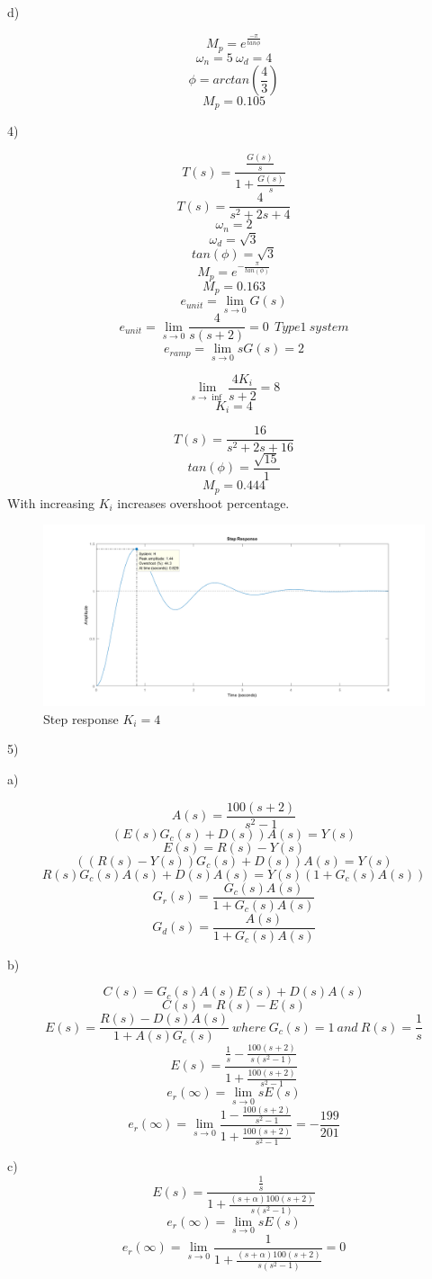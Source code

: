 \documentclass[11pt]{article}
\begin{document}
d)

$$M_p=e^{\frac{-\pi}{tan\phi}}$$
\[\omega_n=5 \> \omega_d=4\]
\[\phi=arctan(\frac{4}{3})\]
$$M_p=0.105$$

4)

\[T(s)=\frac{\frac{G(s)}{s}}{1+\frac{G(s)}{s}}\]
\[T(s)=\frac{4}{s^2+2s+4}\]
\[\omega_n=2\]
\[\omega_d=\sqrt{3}\]
\[tan(\phi)=\sqrt{3}\]
\[M_p=e^{-\frac{\pi}{tan(\phi)}}\]
\[M_p=0.163\]
\[e_{unit}=\lim_{s \to 0} G(s)\]
\[e_{unit}=\lim_{s \to 0} \frac{4}{s(s+2)}=0 \>\> Type1 \> system\]
\[e_{ramp}=\lim_{s \to 0} sG(s)=2\]

\[\lim_{s \to \inf} \frac{4K_i}{s+2}=8\]
$$K_i=4$$

\[T(s)=\frac{16}{s^2+2s+16}\]
\[tan(\phi)=\frac{\sqrt{15}}{1}\]
$$M_p=0.444$$
With increasing $K_i$ increases overshoot percentage.
\begin{figure}[H]
  \includegraphics[scale=0.7, center]{mal}
  \caption{Step response $K_i=4$}
  \label{fig:zero}
\end{figure}  

5)

a)

\[A(s)=\frac{100(s+2)}{s^2-1}\]
\[(E(s)G_c(s)+D(s))A(s)=Y(s)\]
\[E(s)=R(s)-Y(s)\]
\[((R(s)-Y(s))G_c(s)+D(s))A(s)=Y(s)\]
\[R(s)G_c(s)A(s)+D(s)A(s)=Y(s)(1+G_c(s)A(s))\]
$$G_r(s)=\frac{G_c(s)A(s)}{1+G_c(s)A(s)}$$
$$G_d(s)=\frac{A(s)}{1+G_c(s)A(s)}$$

b)

\[C(s)=G_c(s)A(s)E(s)+D(s)A(s)\]
\[C(s)=R(s)-E(s)\]
\[E(s)=\frac{R(s)-D(s)A(s)}{1+A(s)G_c(s)} \> where \> G_c(s)=1 \> and \> R(s)=\frac{1}{s}\]
\[E(s)=\frac{\frac{1}{s}-\frac{100(s+2)}{s(s^2-1)}}{1+\frac{100(s+2)}{s^2-1}}\]
$$e_r(\infty)=\lim_{s\to 0} sE(s)$$
$$e_r(\infty)=\lim_{s\to 0} \frac{1-\frac{100(s+2)}{s^2-1}}{1+\frac{100(s+2)}{s^2-1}}=-\frac{199}{201}$$

c)
\[E(s)=\frac{\frac{1}{s}}{1+\frac{(s+\alpha)100(s+2)}{s(s^2-1)}}\]
$$e_r(\infty)=\lim_{s\to 0} sE(s)$$
$$e_r(\infty)=\lim_{s\to 0} \frac{1}{1+\frac{(s+\alpha)100(s+2)}{s(s^2-1)}}=0$$
\end{document}
